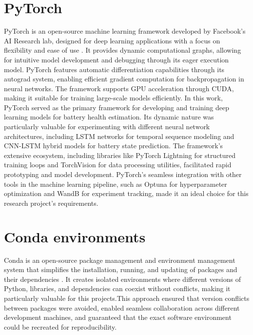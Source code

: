 \section{PyTorch}
PyTorch is an open-source machine learning framework developed by Facebook's AI Research lab, designed for deep learning applications with a focus on flexibility and ease of use \cite{ansel_pytorch_2024}. It provides dynamic computational graphs, allowing for intuitive model development and debugging through its eager execution model. PyTorch features automatic differentiation capabilities through its autograd system, enabling efficient gradient computation for backpropagation in neural networks. The framework supports GPU acceleration through CUDA, making it suitable for training large-scale models efficiently. In this work, PyTorch served as the primary framework for developing and training deep learning models for battery health estimation. Its dynamic nature was particularly valuable for experimenting with different neural network architectures, including LSTM networks for temporal sequence modeling and CNN-LSTM hybrid models for battery state prediction. The framework's extensive ecosystem, including libraries like PyTorch Lightning for structured training loops and TorchVision for data processing utilities, facilitated rapid prototyping and model development. PyTorch's seamless integration with other tools in the machine learning pipeline, such as Optuna for hyperparameter optimization and WandB for experiment tracking, made it an ideal choice for this research project's requirements.

\section{Conda environments}
Conda is an open-source package management and environment management system that simplifies the installation, running, and updating of packages and 
their dependencies \cite{conda_contributors_conda_2025}. It creates isolated environments where different versions of Python, libraries, 
and dependencies can coexist without conflicts, making it particularly valuable for this projects.This approach ensured that version conflicts between packages were avoided, enabled seamless collaboration across different 
development machines, and guaranteed that the exact software environment could be recreated for reproducibility.

